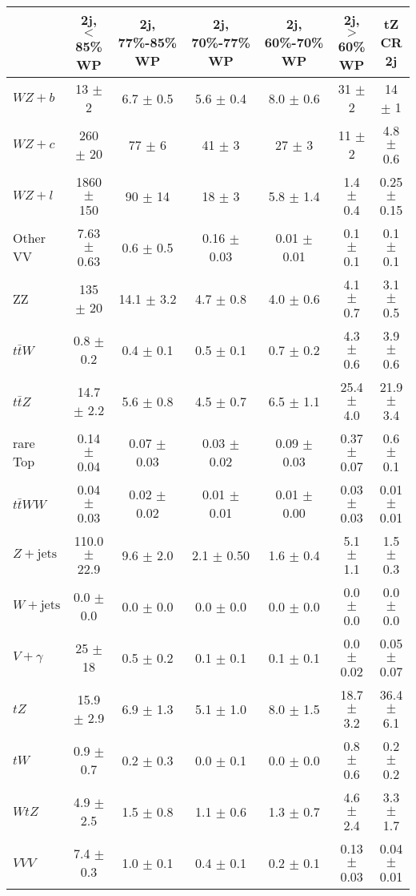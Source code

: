 \begin{tabular}{|l|c|c|c|c|c|c|}
\hline 
 & {2j, $<$85\% WP} & {2j, 77\%-85\% WP} & {2j, 70\%-77\% WP} & {2j, 60\%-70\% WP} & {2j, $>$60\% WP} & {tZ CR 2j}\\
\hline 
  $WZ + b$   & 13 $\pm$ 2 & 6.7 $\pm$ 0.5 & 5.6 $\pm$ 0.4 & 8.0 $\pm$ 0.6 & 31 $\pm$ 2 & 14 $\pm$ 1 \\ 
  $WZ + c$   & 260 $\pm$ 20 & 77 $\pm$ 6 & 41 $\pm$ 3 & 27 $\pm$ 3 & 11 $\pm$ 2 & 4.8 $\pm$ 0.6 \\ 
  $WZ + l$   & 1860 $\pm$ 150 & 90 $\pm$ 14 & 18 $\pm$ 3 & 5.8 $\pm$ 1.4 & 1.4 $\pm$ 0.4 & 0.25 $\pm$ 0.15 \\ 
  Other VV   & 7.63 $\pm$ 0.63 & 0.6 $\pm$ 0.5 & 0.16 $\pm$ 0.03 & 0.01 $\pm$ 0.01 & 0.1 $\pm$ 0.1 & 0.1 $\pm$ 0.1 \\ 
  ZZ   & 135 $\pm$ 20 & 14.1 $\pm$ 3.2 & 4.7 $\pm$ 0.8 & 4.0 $\pm$ 0.6 & 4.1 $\pm$ 0.7 & 3.1 $\pm$ 0.5 \\ 
  $t\bar{t}W$   & 0.8 $\pm$ 0.2 & 0.4 $\pm$ 0.1 & 0.5 $\pm$ 0.1 & 0.7 $\pm$ 0.2 & 4.3 $\pm$ 0.6 & 3.9 $\pm$ 0.6 \\ 
  $t\bar{t}Z$   & 14.7 $\pm$ 2.2 & 5.6 $\pm$ 0.8 & 4.5 $\pm$ 0.7 & 6.5 $\pm$ 1.1 & 25.4 $\pm$ 4.0 & 21.9 $\pm$ 3.4 \\ 
  rare Top   & 0.14 $\pm$ 0.04 & 0.07 $\pm$ 0.03 & 0.03 $\pm$ 0.02 & 0.09 $\pm$ 0.03 & 0.37 $\pm$ 0.07 & 0.6 $\pm$ 0.1 \\ 
  $t\bar{t}WW$   & 0.04 $\pm$ 0.03 & 0.02 $\pm$ 0.02 & 0.01 $\pm$ 0.01 & 0.01 $\pm$ 0.00 & 0.03 $\pm$ 0.03 & 0.01 $\pm$ 0.01 \\ 
  $Z+\text{jets}$   & 110.0 $\pm$ 22.9 & 9.6 $\pm$ 2.0 & 2.1 $\pm$ 0.50 & 1.6 $\pm$ 0.4 & 5.1 $\pm$ 1.1 & 1.5 $\pm$ 0.3 \\ 
  $W+\text{jets}$   & 0.0 $\pm$ 0.0 & 0.0 $\pm$ 0.0 & 0.0 $\pm$ 0.0 & 0.0 $\pm$ 0.0 & 0.0 $\pm$ 0.0 & 0.0 $\pm$ 0.0 \\ 
  $V+\gamma$   & 25 $\pm$ 18 & 0.5 $\pm$ 0.2 & 0.1 $\pm$ 0.1 & 0.1 $\pm$ 0.1 & 0.0 $\pm$ 0.02 & 0.05 $\pm$ 0.07 \\ 
  $tZ$   & 15.9 $\pm$ 2.9 & 6.9 $\pm$ 1.3 & 5.1 $\pm$ 1.0 & 8.0 $\pm$ 1.5 & 18.7 $\pm$ 3.2 & 36.4 $\pm$ 6.1 \\ 
  $tW$   & 0.9 $\pm$ 0.7 & 0.2 $\pm$ 0.3 & 0.0 $\pm$ 0.1 & 0.0 $\pm$ 0.0 & 0.8 $\pm$ 0.6 & 0.2 $\pm$ 0.2 \\ 
  $WtZ$   & 4.9 $\pm$ 2.5 & 1.5 $\pm$ 0.8 & 1.1 $\pm$ 0.6 & 1.3 $\pm$ 0.7 & 4.6 $\pm$ 2.4 & 3.3 $\pm$ 1.7 \\ 
  $VVV$   & 7.4 $\pm$ 0.3 & 1.0 $\pm$ 0.1 & 0.4 $\pm$ 0.1 & 0.2 $\pm$ 0.1 & 0.13 $\pm$ 0.03 & 0.04 $\pm$ 0.01 \\ 

\end{tabular}
